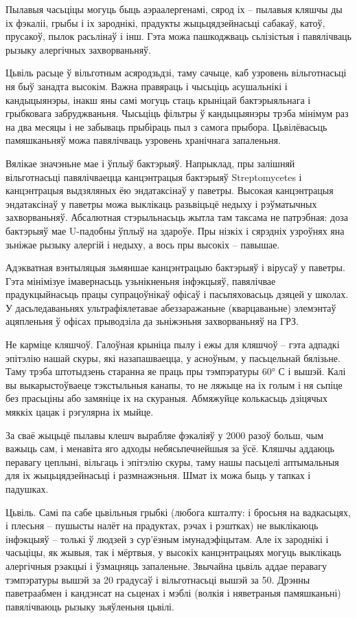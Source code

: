 Пылавыя часьціцы могуць быць аэраалергенамі, сярод іх – пылавыя кляшчы ды іх фэкаліі, грыбы і іх зароднікі, прадукты жыцьцядзейнасьці сабакаў, катоў, прусакоў, пылок расьлінаў і інш. Гэта можа пашкоджваць сьлізістыя і павялічваць рызыку алергічных захворваньняў.

Цьвіль расьце ў вільготным асяродзьдзі, таму сачыце, каб узровень вільготнасьці ня быў занадта высокім. Важна правяраць і чысьціць асушальнікі і кандыцыянэры, інакш яны самі могуць стаць крыніцай бактэрыяльнага і грыбковага забруджваньня. Чысьціць фільтры ў кандыцыянэры трэба мінімум раз на два месяцы і не забываць прыбіраць пыл з самога прыбора. Цьвілёвасьць памяшканьняў можа павялічваць узровень хранічнага запаленьня.

Вялікае значэньне мае і ўплыў бактэрыяў. Напрыклад, пры залішняй вільготнасьці павялічваецца канцэнтрацыя бактэрыяў Streptomycetes і канцэнтрацыя выдзяляных ёю эндатаксінаў у паветры. Высокая канцэнтрацыя эндатаксінаў у паветры можа выклікаць разьвіцьцё недыху і рэўматычных захворваньняў. Абсалютная стэрыльнасьць жытла там таксама не патрэбная: доза бактэрыяў мае U-падобны ўплыў на здароўе. Пры нізкіх і сярэдніх узроўнях яна зьніжае рызыку алергій і недыху, а вось пры высокіх – павышае.

Адэкватная вэнтыляцыя зьмяншае канцэнтрацыю бактэрыяў і вірусаў у паветры. Гэта мінімізуе імавернасьць узьнікненьня інфэкцыяў, павялічвае прадукцыйнасьць працы супрацоўнікаў офісаў і пасьпяховасьць дзяцей у школах. У дасьледаваньнях ультрафіялетавае абеззаражаньне (кварцаваньне) элемэнтаў ацяпленьня ў офісах прыводзіла да зьніжэньня захворваньняў на ГРЗ.

Не карміце кляшчоў. Галоўная крыніца пылу і ежы для кляшчоў – гэта адпадкі эпітэлію нашай скуры, які назапашваецца, у асноўным, у пасьцельнай бялізьне. Таму трэба штотыдзень старанна яе праць пры тэмпэратуры 60° С і вышэй. Калі вы выкарыстоўваеце тэкстыльныя канапы, то не ляжыце на іх голым і ня сьпіце без прасьціны або замяніце іх на скураныя. Абмяжуйце колькасьць дзіцячых мяккіх цацак і рэгулярна іх мыйце.

За сваё жыцьцё пылавы клешч вырабляе фэкаліяў у 2000 разоў больш, чым важыць сам, і менавіта яго адходы небясьпечнейшыя за ўсё. Кляшчы аддаюць перавагу цеплыні, вільгаць і эпітэлію скуры, таму нашы пасьцелі аптымальныя для іх жыцьцядзейнасьці і размнажэньня. Шмат іх можа быць у тапках і падушках.

Цьвіль. Самі па сабе цьвільныя грыбкі (любога кшталту: і бросьня на вадкасьцях, і плесьня – пушысты налёт на прадуктах, рэчах і рэштках) не выклікаюць інфэкцыяў – толькі ў людзей з сур'ёзным імунадэфіцытам. Але іх зароднікі і часьціцы, як жывыя, так і мёртвыя, у высокіх канцэнтрацыях могуць выклікаць алергічныя рэакцыі і ўзмацняць запаленьне. Звычайна цьвіль аддае перавагу тэмпэратуры вышэй за 20 градусаў і вільготнасьці вышэй за 50. Дрэнны паветраабмен і кандэнсат на сьценах і мэблі (волкія і няветраныя памяшканьні) павялічваюць рызыку зьяўленьня цьвілі.

